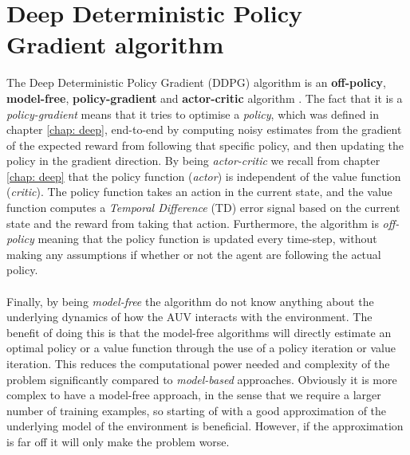 \section{Deep Deterministic Policy Gradient algorithm}
The Deep Deterministic Policy Gradient (DDPG) algorithm is an \textbf{off-policy}, \textbf{model-free}, \textbf{policy-gradient} and \textbf{actor-critic} algorithm \cite{Emami}. The fact that it is a \textit{policy-gradient} means that it tries to optimise a \textit{policy}, which was defined in chapter \ref{chap: deep}, end-to-end by computing noisy estimates from the gradient of the expected reward from following that specific policy, and then updating the policy in the gradient direction. By being \textit{actor-critic} we recall from chapter \ref{chap: deep} that the policy function (\textit{actor}) is independent of the value function (\textit{critic}). The policy function takes an action in the current state, and the value function computes a \textit{Temporal Difference} (TD) error signal based on the current state and the reward from taking that action. Furthermore, the algorithm is \textit{off-policy} meaning that the policy function is updated every time-step, without making any assumptions if whether or not the agent are following the actual policy.\\\\Finally, by being \textit{model-free} the algorithm do not know anything about the underlying dynamics of how the AUV interacts with the environment. The benefit of doing this is that the model-free algorithms will directly estimate an optimal policy or a value function through the use of a policy iteration or value iteration. This reduces the computational power needed and complexity of the problem significantly compared to \textit{model-based} approaches. Obviously it is more complex to have a model-free approach, in the sense that we require a larger number of training examples, so starting of with a good approximation of the underlying model of the environment is beneficial. However, if the approximation is far off it will only make the problem worse.
